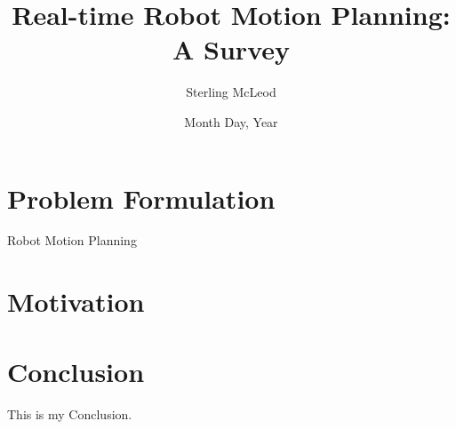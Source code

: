 \documentclass[10pt,conference]{ieeeconf}
\begin{document}
\author{Sterling McLeod}
\title {Real-time Robot Motion Planning: A Survey}
\date {Month Day, Year}

\maketitle


\section {Problem Formulation}

	Robot Motion Planning 
    

\section {Motivation}

	


	



\section {Conclusion}
    This is my Conclusion.




\end{document}

